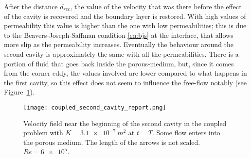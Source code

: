 After the distance $d_{rec}$, the value of the velocity that was there 
before the effect of the cavity is recovered and the boundary layer is 
restored. With high values of permeability this value is higher than the one 
with low permeabilities; this is due to the Beavers-Joseph-Saffman condition 
\eqref{eq:bjs} at the interface, that allows more slip as the permeability 
increases. Eventually the behaviour around the 
second cavity is approximately the same with all the permeabilities. There is a 
portion of fluid that goes back inside the porous-medium, but, since it comes 
from the corner eddy, the values involved are lower compared to what happens in 
the first cavity, so this effect does not seem to influence the free-flow 
notably (see Figure~\ref{fig:coupledsecondcav}).
\begin{figure}
	\centering
	\texttt{[image: coupled\_second\_cavity\_report.png]}
	\caption[Velocity field near the beginning of the second cavity in the coupled problem]{Velocity field near the beginning of the second cavity in the coupled problem with $K=\SI{3.1e-7}{m^2}$ at $t=T$. Some flow enters into the porous medium. The length of the arrows is not scaled. $Re=\num{6e5}$.}
	\label{fig:coupledsecondcav}
\end{figure}